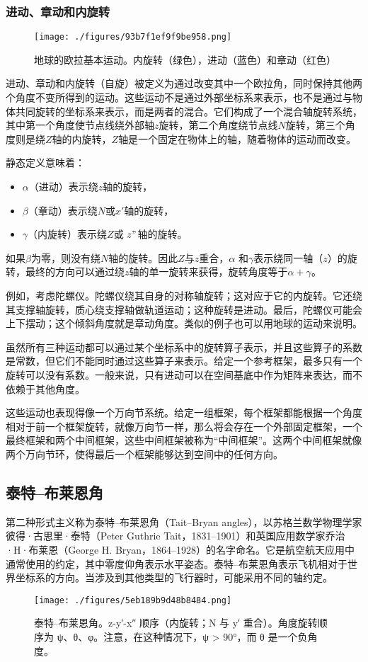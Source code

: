 \subsubsection{进动、章动和内旋转}
\begin{figure}[ht]
\centering
\texttt{[image: ./figures/93b7f1ef9f9be958.png]}
\caption{地球的欧拉基本运动。内旋转（绿色），进动（蓝色）和章动（红色）} \label{fig_OLJ_3}
\end{figure}
进动、章动和内旋转（自旋）被定义为通过改变其中一个欧拉角，同时保持其他两个角度不变所得到的运动。这些运动不是通过外部坐标系来表示，也不是通过与物体共同旋转的坐标系来表示，而是两者的混合。它们构成了一个混合轴旋转系统，其中第一个角度使节点线绕外部轴$z$旋转，第二个角度绕节点线$N$旋转，第三个角度则是绕$Z$轴的内旋转，$Z$轴是一个固定在物体上的轴，随着物体的运动而改变。

静态定义意味着：
\begin{itemize}
\item $\alpha$（进动）表示绕$z$轴的旋转，
\item $\beta$（章动）表示绕$N$或$x'$轴的旋转，
\item $\gamma$（内旋转）表示绕$Z$或 $z"$轴的旋转。
\end{itemize}
如果$\beta$为零，则没有绕$N$轴的旋转。因此$Z$与$z$重合，$\alpha$ 和$\gamma$表示绕同一轴（$z$）的旋转，最终的方向可以通过绕$z$轴的单一旋转来获得，旋转角度等于$\alpha+\gamma$。

例如，考虑陀螺仪。陀螺仪绕其自身的对称轴旋转；这对应于它的内旋转。它还绕其支撑轴旋转，质心绕支撑轴做轨道运动；这种旋转是进动。最后，陀螺仪可能会上下摆动；这个倾斜角度就是章动角度。类似的例子也可以用地球的运动来说明。

虽然所有三种运动都可以通过某个坐标系中的旋转算子表示，并且这些算子的系数是常数，但它们不能同时通过这些算子来表示。给定一个参考框架，最多只有一个旋转可以没有系数。一般来说，只有进动可以在空间基底中作为矩阵来表达，而不依赖于其他角度。

这些运动也表现得像一个万向节系统。给定一组框架，每个框架都能根据一个角度相对于前一个框架旋转，就像万向节一样，那么将会存在一个外部固定框架，一个最终框架和两个中间框架，这些中间框架被称为“中间框架”。这两个中间框架就像两个万向节环，使得最后一个框架能够达到空间中的任何方向。
\subsection{泰特–布莱恩角}
第二种形式主义称为泰特–布莱恩角（Tait–Bryan angles），以苏格兰数学物理学家彼得·古思里·泰特（Peter Guthrie Tait，1831–1901）和英国应用数学家乔治·H·布莱恩（George H. Bryan，1864–1928）的名字命名。它是航空航天应用中通常使用的约定，其中零度仰角表示水平姿态。泰特–布莱恩角表示飞机相对于世界坐标系的方向。当涉及到其他类型的飞行器时，可能采用不同的轴约定。
\begin{figure}[ht]
\centering
\texttt{[image: ./figures/5eb189b9d48b8484.png]}
\caption{泰特–布莱恩角。z-y′-x″ 顺序（内旋转；N 与 y′ 重合）。角度旋转顺序为 ψ、θ、φ。注意，在这种情况下，ψ > 90°，而 θ 是一个负角度。} \label{fig_OLJ_4}
\end{figure}
